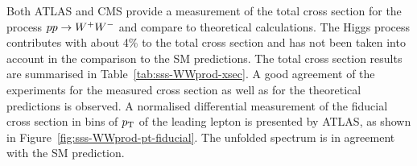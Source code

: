 
Both ATLAS and CMS provide a measurement of the total cross section for the process $pp \rightarrow W^+W^-$
and compare to theoretical calculations. The Higgs process contributes with about 4\% to the total 
cross section and has not been taken into account in the comparison to the SM predictions.
The total cross section results are summarised in Table~\ref{tab:sss-WWprod-xsec}.
A good agreement of the experiments for the measured cross section as well as for the theoretical predictions
is observed.
A normalised differential measurement of the fiducial cross section in bins of $p_{\mathrm{T}}$ of the leading lepton is presented by ATLAS,
as shown in Figure~\ref{fig:sss-WWprod-pt-fiducial}. The unfolded spectrum is in agreement with the SM prediction.

\begin{table}[htp]

\begin{center}
\caption{Summary of measured fiducial and total $\WW$ production cross sections from ATLAS and CMS 
at 7 and 8 TeV centre-of-mass energies in the $\lnu\lnu$ final state.}
\end{center}
\label{tab:sss-WWprod-xsec}
\end{table}%

